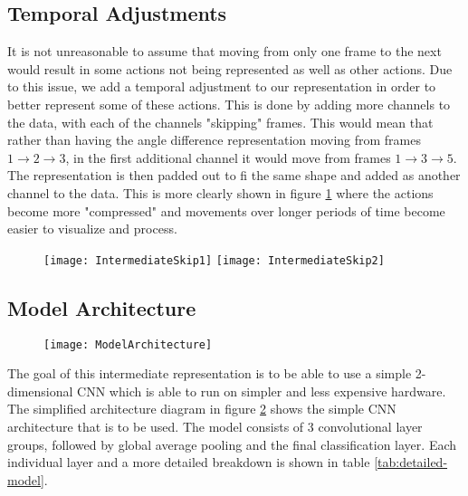 \subsection{Temporal Adjustments}

It is not unreasonable to assume that moving from only one frame to the next would result in some actions not being represented as well as other actions. Due to this issue, we add a temporal adjustment to our representation in order to better represent some of these actions. This is done by adding more channels to the data, with each of the channels "skipping" frames. This would mean that rather than having the angle difference representation moving from frames $1 \rightarrow 2 \rightarrow 3$, in the first additional channel it would move from frames $1 \rightarrow 3 \rightarrow 5$. The representation is then padded out to fi the same shape and added as another channel to the data. This is more clearly shown in figure \ref{fig:intermediate-stacked-skip} where the actions become more "compressed" and movements over longer periods of time become easier to visualize and process.

\begin{figure}[ht]
	\texttt{[image: IntermediateSkip1]}
	\texttt{[image: IntermediateSkip2]}
	\centering
	\caption{}
	\label{fig:intermediate-stacked-skip}
\end{figure}

\subsection{Model Architecture}

\begin{figure}[ht]
	\texttt{[image: ModelArchitecture]}
	\centering
	\caption{}
	\label{fig:model-architecture}
\end{figure}

The goal of this intermediate representation is to be able to use a simple 2-dimensional CNN which is able to run on simpler and less expensive hardware. The simplified architecture diagram in figure \ref{fig:model-architecture} shows the simple CNN architecture that is to be used. The model consists of 3 convolutional layer groups, followed by global average pooling and the final classification layer. Each individual layer and a more detailed breakdown is shown in table \ref{tab:detailed-model}.

